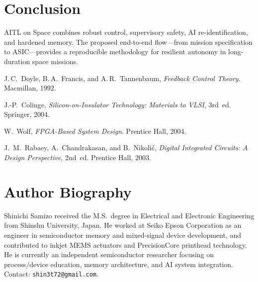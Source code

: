 \documentclass[conference]{IEEEtran}
\begin{document}
\section{Conclusion}
AITL on Space combines robust control, supervisory safety, AI re-identification, and hardened memory. The proposed end-to-end flow—from mission specification to ASIC—provides a reproducible methodology for resilient autonomy in long-duration space missions.

\begin{thebibliography}{99}
J.\,C.~Doyle, B.\,A.~Francis, and A.\,R.~Tannenbaum,
\emph{Feedback Control Theory}. Macmillan, 1992.

J.-P.~Colinge, \emph{Silicon-on-Insulator Technology: Materials to VLSI}, 3rd~ed. Springer, 2004.

W.~Wolf, \emph{FPGA-Based System Design}. Prentice Hall, 2004.

J.~M.~Rabaey, A.~Chandrakasan, and B.~Nikoli\'c, \emph{Digital Integrated Circuits: A Design Perspective}, 2nd~ed. Prentice Hall, 2003.
\end{thebibliography}

\section*{Author Biography}
Shinichi Samizo received the M.S.\ degree in Electrical and Electronic Engineering from Shinshu University, Japan. He worked at Seiko Epson Corporation as an engineer in semiconductor memory and mixed-signal device development, and contributed to inkjet MEMS actuators and PrecisionCore printhead technology. He is currently an independent semiconductor researcher focusing on process/device education, memory architecture, and AI system integration. Contact: \texttt{shin3t72@gmail.com}.
\end{document}
